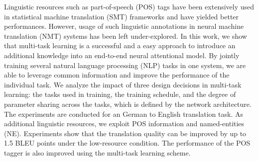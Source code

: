 Linguistic resources such as part-of-speech (POS) tags have been extensively used in statistical machine translation (SMT) frameworks and have yielded better performances. However, usage of such linguistic annotations in neural machine translation (NMT) systems has been left under-explored. In this work, we show that multi-task learning is a successful and a easy approach to introduce an additional knowledge into an end-to-end neural attentional model. By jointly training several natural language processing (NLP) tasks in one system, we are able to leverage common information and improve the performance of the individual task. We analyze the impact of three design decisions in multi-task learning: the tasks used in training, the training schedule, and the degree of parameter sharing across the tasks, which is defined by the network architecture. The experiments are conducted for an German to English translation task. As additional linguistic resources, we exploit POS information and named-entities (NE). Experiments show that the translation quality can be improved by up to 1.5 BLEU points under the low-resource condition. The performance of the POS tagger is also improved using the multi-task learning scheme.
